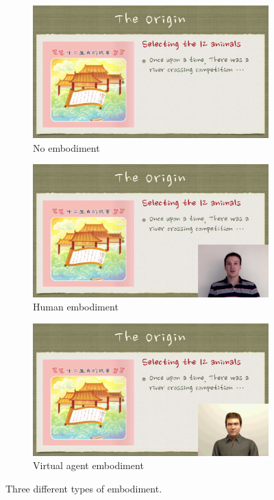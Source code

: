 \documentclass{sigchi}
\begin{document}
\begin{figure}
    \centering
    \begin{subfigure}{0.3\textwidth}
        \centering
        \includegraphics[width=\textwidth]{Figures/Audio.png}
        \caption{No embodiment}
        \label{fig:noembodiment}
    \end{subfigure}
    
    \begin{subfigure}{0.3\textwidth}
        \centering
        \includegraphics[width=\textwidth]{Figures/Human.png}
        \caption{Human embodiment}
        \label{fig:humanembodiment}
    \end{subfigure}
    
    \begin{subfigure}{0.3\textwidth}
        \centering
        \includegraphics[width=\textwidth]{Figures/Agent.png}
        \caption{Virtual agent embodiment}
        \label{fig:virtualembodiment}
    \end{subfigure}
    \caption{Three different types of embodiment.}
    \label{fig:embodiments}
\end{figure}
\end{document}
